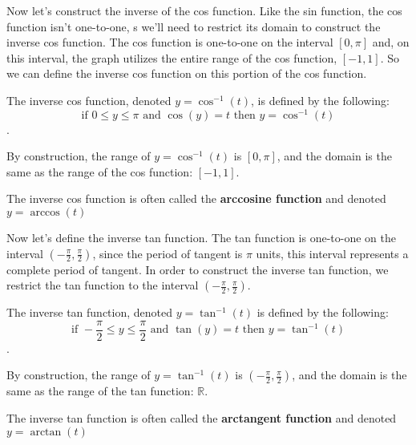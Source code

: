 Now let's construct the inverse of the cos function. Like the sin function, the
cos function isn't one-to-one, s we'll need to restrict its domain to construct
the inverse cos function. The cos function is one-to-one on the interval $[0,
\pi]$ and, on this interval, the graph utilizes the entire range of the cos
function, $[-1,1]$. So we can define the inverse cos function on this portion of
the cos function.

\begin{definition}
  \label{def:inverse_cos_function}

  The inverse cos function, denoted $y = \cos^{-1} (t)$, is defined by the
  following:
  \[
  \textrm{if } 0 \le y \le \pi \textrm{ and } \cos(y) = t \textrm{ then } y =
  \cos^{-1} (t)
  \].

  By construction, the range of $y = \cos^{-1} (t)$ is $[0, \pi]$, and the
  domain is the same as the range of the cos function: $[-1, 1]$.

  \begin{note}
    The inverse cos function is often called the \textbf{arccosine function} and
    denoted $y = \arccos (t)$
  \end{note}
\end{definition}

Now let's define the inverse tan function. The tan function is one-to-one on the
interval $(-\frac{\pi}{2},\frac{\pi}{2})$, since the period of tangent is $\pi$
units, this interval represents a complete period of tangent. In order to
construct the inverse tan function, we restrict the tan function to the interval
$(-\frac{\pi}{2},\frac{\pi}{2})$.

\begin{definition}
  \label{def:inverse_tan_function}

  The inverse tan function, denoted $y = \tan^{-1} (t)$ is defined by the
  following:
  \[
  \textrm{if } -\frac{\pi}{2} \le y \le \frac{\pi}{2} \textrm{ and } \tan(y) = t
  \textrm{ then } y = \tan^{-1} (t)
  \].

  By construction, the range of $y = \tan^{-1} (t)$ is
  $(-\frac{\pi}{2},\frac{\pi}{2})$, and the domain is the same as the range of
  the tan function: $\mathbb{R}$.

  \begin{note}
    The inverse tan function is often called the \textbf{arctangent function}
    and denoted $y = \arctan (t)$
  \end{note}
\end{definition}

